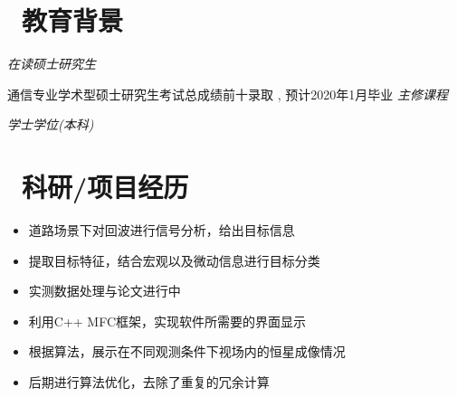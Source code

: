 \documentclass{resume}
\begin{document}


\medskip\noindent
\section{\faGraduationCap\  教育背景}
\textit{在读硕士研究生}
\item{\quad \quad \quad \quad \quad \quad \quad \quad 通信专业学术型硕士研究生考试总成绩前十录取 , 预计2020年1月毕业}\newline
\textit{主修课程}


\textit{学士学位(本科)}

\section{\faUsers\ 科研/项目经历}

\begin{itemize}[topsep = 0 pt, partopsep = 0pt]
  \item 道路场景下对回波进行信号分析，给出目标信息
  \item 提取目标特征，结合宏观以及微动信息进行目标分类
  \item 实测数据处理与论文进行中
\end{itemize}


\begin{itemize}[topsep = 0 pt, partopsep = 0pt]
  \item 利用C++ MFC框架，实现软件所需要的界面显示
  \item 根据算法，展示在不同观测条件下视场内的恒星成像情况
  \item 后期进行算法优化，去除了重复的冗余计算
\end{itemize}
\end{document}
